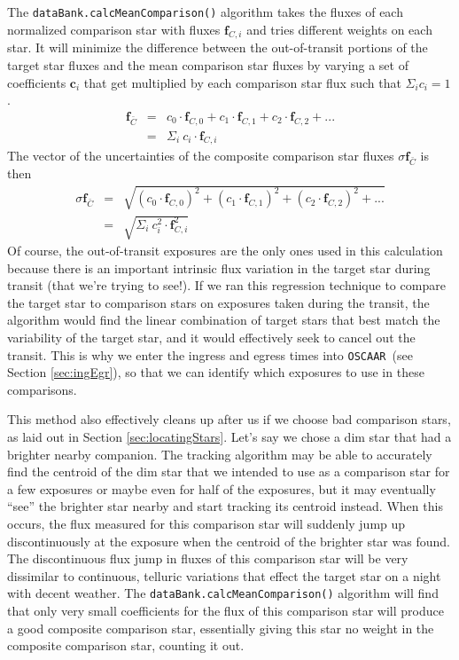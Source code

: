 \documentclass[a4paper]{article}
\newcommand{\code}[1]{\texttt{#1}}
\newcommand{\oscaar}{\code{OSCAAR}~}
\begin{document}
The \code{dataBank.calcMeanComparison()} algorithm takes the fluxes of each normalized comparison star with fluxes $\mathbf{f}_{C,i}$ and tries different weights on each star. It will minimize the difference between the out-of-transit portions of the target star fluxes and the mean comparison star fluxes by varying a set of coefficients $\mathbf{c}_i$ that get multiplied by each comparison star flux such that $\Sigma_i c_i = 1$.
\begin{eqnarray} 
\mathbf{f}_{\bar{C}} &=& c_0 \cdot \mathbf{f}_{C,0}  + c_1 \cdot \mathbf{f}_{C,1} + c_2 \cdot \mathbf{f}_{C,2} + ...\\
    &=& \Sigma_i ~ c_i \cdot \mathbf{f}_{C,i}
\end{eqnarray}
The vector of the uncertainties of the composite comparison star fluxes $\sigma \mathbf{f}_{\bar{C}}$ is then
\begin{eqnarray} 
\sigma \mathbf{f}_{\bar{C}} &=& \sqrt{ \left( c_0 \cdot \mathbf{f}_{C,0} \right)^2  + \left(  c_1 \cdot \mathbf{f}_{C,1} \right)^2+ \left( c_2 \cdot \mathbf{f}_{C,2} \right)^2+ ...} \\
     &=& \sqrt{ \Sigma_i ~ c_i^2 \cdot \mathbf{f}_{C,i}^2}
\end{eqnarray}
Of course, the out-of-transit exposures are the only ones used in this calculation because there is an important intrinsic flux variation in the target star during transit (that we're trying to see!). If we ran this regression technique to compare the target star to comparison stars on exposures taken during the transit, the algorithm would find the linear combination of target stars that best match the variability of the target star, and it would effectively seek to cancel out the transit. This is why we enter the ingress and egress times into \oscaar (see Section \ref{sec:ingEgr}), so that we can identify which exposures to use in these comparisons. 

This method also effectively cleans up after us if we choose bad comparison stars, as laid out in Section \ref{sec:locatingStars}. Let's say we chose a dim star that had a brighter nearby companion. The tracking algorithm may be able to accurately find the centroid of the dim star that we intended to use as a comparison star for a few exposures or maybe even for half of the exposures, but it may eventually ``see'' the brighter star nearby and start tracking its centroid instead. When this occurs, the flux measured for this comparison star will suddenly jump up discontinuously at the exposure when the centroid of the brighter star was found. The discontinuous flux jump in fluxes of this comparison star will be very dissimilar to continuous, telluric variations that effect the target star on a night with decent weather. The \code{dataBank.calcMeanComparison()} algorithm will find that only very small coefficients for the flux of this comparison star will produce a good composite comparison star, essentially giving this star no weight in the composite comparison star, counting it out. 
\end{document}
